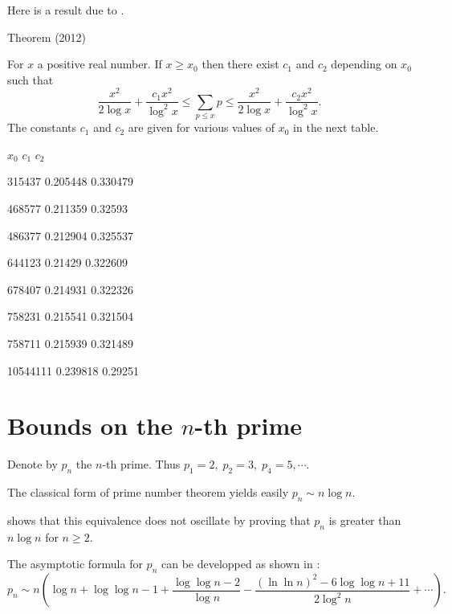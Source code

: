 \par 
  \par 
Here is a result due to 
\cite{Trevino*12}.
\par 
\begin{thm}{Theorem (2012)}

For $x$ a positive real number. If $x \geq x_0$ then there exist $c_1$
and $c_2$ depending on $x_0$ such that
$$
\frac{x^2}{2\log{x}} +
\frac{c_1 x^2}{\log^2{x}} \leq \sum_{p \leq x} p \leq
\frac{x^2}{2\log{x}} + \frac{c_2 x^2}{\log^2{x}}.
$$
The constants
$c_1$ and $c_2$ are given for various values of $x_0$ in the next
table.

  
  
    
      $x_0$
      $c_1$
      $c_2$
    
  
  
    315437
    0.205448
    0.330479
  
  
    468577
    0.211359
    0.32593
  
  
    486377
    0.212904
    0.325537
  
  
    644123
    0.21429
    0.322609
  
  
    678407
    0.214931
    0.322326
  
  
    758231
    0.215541
    0.321504
  
  
    758711
    0.215939
    0.321489
  
  
    10544111
    0.239818
    0.29251
  
  

\end{thm}

\par 


\section{Bounds on the $n$-th prime}



Denote by $p_n$  the $n$-th prime. Thus $p_1=2,\;p_2=3,\; p_4=5,\cdots$.

The classical form of prime number theorem yields easily
$p_n \sim n \log n.$ 

\cite{Rosser*38}
shows that this equivalence does not oscillate
by proving that $p_n$ is greater than $n\log n$ for $n\geq 2$.  


The asymptotic formula for $p_n$ can be developped as shown in
\cite{Cipolla*02}:
$$
p_n\sim n\left(\log n+\log\log n -1+\frac{\log\log n-2}{\log n}
-\frac{(\ln\ln n)^2-6\log\log n +11}{2\log^2 n}+\cdots\right).
$$

